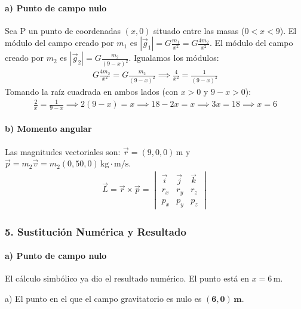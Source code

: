 \paragraph{a) Punto de campo nulo}
Sea P un punto de coordenadas $(x,0)$ situado entre las masas ($0<x<9$).
El módulo del campo creado por $m_1$ es $|\vec{g}_1| = G \frac{m_1}{x^2} = G \frac{4m_2}{x^2}$.
El módulo del campo creado por $m_2$ es $|\vec{g}_2| = G \frac{m_2}{(9-x)^2}$.
Igualamos los módulos:
\begin{gather}
    G \frac{4m_2}{x^2} = G \frac{m_2}{(9-x)^2} \implies \frac{4}{x^2} = \frac{1}{(9-x)^2}
\end{gather}
Tomando la raíz cuadrada en ambos lados (con $x>0$ y $9-x>0$):
\begin{gather}
    \frac{2}{x} = \frac{1}{9-x} \implies 2(9-x) = x \implies 18 - 2x = x \implies 3x = 18 \implies x=6
\end{gather}
\paragraph{b) Momento angular}
Las magnitudes vectoriales son: $\vec{r} = (9,0,0)\,\text{m}$ y $\vec{p} = m_2\vec{v} = m_2(0,50,0)\,\text{kg}\cdot\text{m/s}$.
\begin{gather}
    \vec{L} = \vec{r} \times \vec{p} = \begin{vmatrix} \vec{i} & \vec{j} & \vec{k} \\ r_x & r_y & r_z \\ p_x & p_y & p_z \end{vmatrix}
\end{gather}

\subsubsection*{5. Sustitución Numérica y Resultado}
\paragraph{a) Punto de campo nulo}
El cálculo simbólico ya dio el resultado numérico. El punto está en $x=6\,\text{m}$.
\begin{cajaresultado}
a) El punto en el que el campo gravitatorio es nulo es $\boldsymbol{(6, 0)\,\textbf{m}}$.
\end{cajaresultado}


